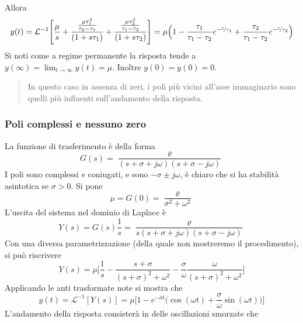\documentclass[10pt, letterpaper]{report}
\begin{document}
    Allora 
    $$ y(t)=
    \mathcal{L}^{-1}\Bigg[\frac{\mu}{s}+
    \frac{\frac{\mu\tau_1^2}{\tau_2-\tau_1}}{(1+s\tau_1)}+\frac{\frac{\mu\tau_2^2}{\tau_1-\tau_2}}{(1+s\tau_2)}\Bigg]
    =\mu\Big(1-\frac{\tau_1}{\tau_1-\tau_2}e^{-\nicefrac{t}{\tau_1}}+ 
    \frac{\tau_2}{\tau_1-\tau_2}e^{-\nicefrac{t}{\tau_2}}\Big)
    $$
    Si noti come a regime permanente la risposta tende a $y(\infty)=\lim_{t\rightarrow \infty}y(t)=\mu$.
    Inoltre $y(0)=\dot{y}(0)=0$.\begin{quote}
        In questo caso in assenza di zeri, i poli più vicini all'asse immaginario sono quelli più 
        influenti sull'andamento della risposta.
    \end{quote}
\subsubsection{Poli complessi e nessuno zero}
La funzione di trasferimento è della forma
$$ G(s)=\frac{\varrho}{(s+\sigma+j\omega)(s+\sigma-j\omega)}$$
I poli sono complessi e coniugati, e sono $-\sigma \pm j\omega$, è chiaro che 
si ha stabilità asintotica se $\sigma>0$. Si pone 
$$ \mu=G(0)=\frac{\varrho}{\sigma^2+\omega^2}$$
L'uscita del sistema nel dominio di Laplace è
$$ Y(s)=G(s)\frac{1}{s}=\frac{\varrho}{s(s+\sigma+j\omega)(s+\sigma-j\omega)}$$ 
Con una diversa parametrizzazione (della quale non mostreremo il procedimento), si può 
riscrivere 
$$Y(s)= \mu\Big[
\frac{1}{s}-\frac{s+\sigma}{(s+\sigma)^2+\omega^2}-\frac{\sigma}{\omega}\frac{\omega}{(s+\sigma)^2+\omega^2}    
\Big] $$
Applicando le anti trasformate note si mostra che 
$$y(t)=\mathcal{L}^{-1}[Y(s)]= 
\mu\Big[ 
    1-e^{-\sigma t}\big(\cos(\omega t)+\frac{\sigma}{\omega}\sin(\omega t)\big)
\Big]$$
L'andamento della risposta consisterà in delle oscillazioni smorzate che 
\end{document}
